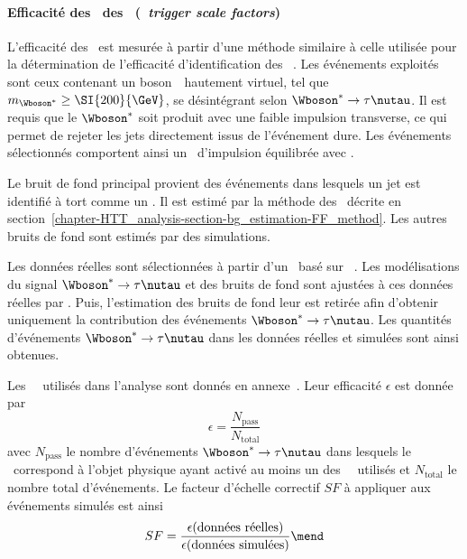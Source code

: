 \paragraph{Efficacité des \HLTpaths\ des \tauh\ (\emph{\tauh\ trigger scale factors})}
L'efficacité des \HLTpaths\ est mesurée à partir d'une méthode
similaire à celle utilisée
pour la détermination de
l'efficacité d'identification des \tauh~\cite{CMS-NOTE-2019-163}.
Les événements exploités sont ceux contenant un boson~\Wboson\ hautement virtuel,
tel que $m_{\Wboson^*}\geq\SI{200}{\GeV}$,
se désintégrant selon $\Wboson^* \to \tau\nutau$.
Il est requis que le $\Wboson^*$ soit produit avec une faible impulsion transverse,
ce qui permet de rejeter les jets directement issus de l'événement dure.
Les événements sélectionnés comportent ainsi
un \tauh\ d'impulsion équilibrée avec \vMET.
\par
Le bruit de fond principal provient des événements
dans lesquels un jet est identifié à tort comme un \tauh.
Il est estimé par la méthode des \fakefactors\ décrite en section~\ref{chapter-HTT_analysis-section-bg_estimation-FF_method}.
Les autres bruits de fond sont estimés par des simulations.
\par
Les données réelles sont sélectionnées à partir d'un \HLTpath\ basé sur \MET~\cite{CMS-NOTE-2019-163,CMS-NOTE-2020-218}.
Les modélisations du signal $\Wboson^* \to \tau\nutau$ et des bruits de fond sont ajustées à ces données réelles par \COMBINE.
Puis, l'estimation des bruits de fond leur est retirée afin d'obtenir uniquement la contribution des événements $\Wboson^* \to \tau\nutau$.
Les quantités d'événements $\Wboson^* \to \tau\nutau$ dans les données réelles et simulées sont ainsi obtenues.
\par
Les \HLTpaths\ \HLTSingleTau\ utilisés dans l'analyse sont donnés en annexe~.
Leur efficacité $\epsilon$ est donnée par
\begin{equation}
\epsilon = \frac{N_\text{pass}}{N_\text{total}}
\end{equation}
avec
$N_\text{pass}$ le nombre d'événements $\Wboson^* \to \tau\nutau$ dans lesquels le \tauh\ correspond à
l'objet physique ayant activé au moins un des \HLTpaths\ \HLTSingleTau\ utilisés
et
$N_\text{total}$ le nombre total d'événements.
Le facteur d'échelle correctif $SF$ à appliquer aux événements simulés est ainsi
\begin{equation}
SF = \frac{\epsilon(\text{données réelles})}{\epsilon(\text{données simulées})}
\mend
\end{equation}
